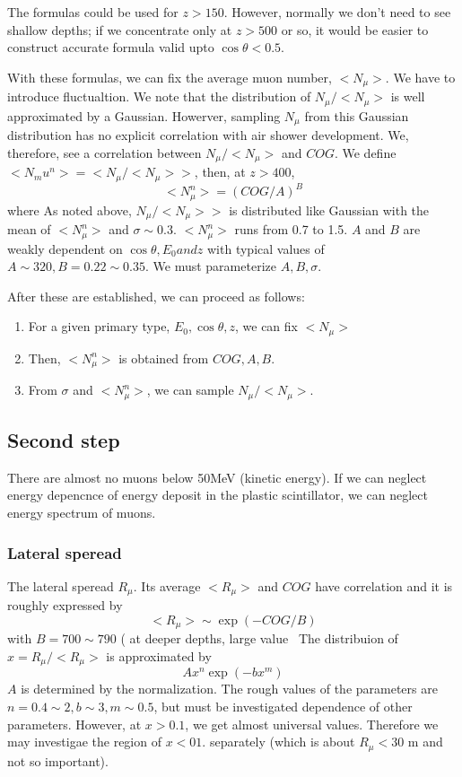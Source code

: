 \documentclass[a4j]{jarticle}
\begin{document}
The formulas could be used for $z>150$. However, normally we don't need
to see shallow depths; if we concentrate only at $z>500$ or so, 
it would be easier to construct accurate formula  valid upto $\cos\theta < 0.5$.


With these formulas, we can fix the average muon number, $<N_\mu>$.
We have to introduce fluctualtion. We note that the distribution of
$N_\mu/<N_\mu>$ is well approximated by a
Gaussian.  Howerver, sampling $N_\mu$ from  this Gaussian distribution
has no explicit correlation with air shower development.  We, therefore,
see a correlation between $N_\mu/<N_\mu>$ and $COG$. 
We define  $<N_mu^n> = < N_\mu/<N_\mu> >$, then, 
 at $z>400$,
\begin{equation}
          <N_\mu^n> = (COG/ A)^B
\end{equation}
where  
As noted above, $N_\mu/<N_\mu> >$
is distributed like Gaussian with the mean of $<N_\mu^n>$ and
$\sigma\sim 0.3$.
  $<N_\mu^n> $ runs from 0.7 to 1.5.
$A$ and $B$ are weakly dependent on $\cos\theta, E_0 and z$ 
with typical values of $ A\sim 320, B=0.22\sim  0.35 $. 
We must parameterize $A, B, \sigma$. 

After these are established, we can proceed as follows:
\begin{enumerate}
\item For a given primary type, $E_0, \cos\theta, z$, we can fix $<N_\mu>$
\item Then,  $<N_\mu^n>$ is obtained from $COG, A, B$.
\item From $\sigma$ and $<N_\mu^n>$, we can sample $N_\mu/<N_\mu>$.
\end{enumerate}


\subsection{Second step}
There are almost no muons below 50MeV (kinetic energy). If we can neglect
energy depencnce of energy deposit in the plastic scintillator,
we can neglect energy spectrum of muons. 


\subsubsection{Lateral speread}
The lateral speread $R_\mu$.  Its average $<R_\mu>$ and $COG$
have correlation and it is roughly expressed by
\begin{equation}
  <R_\mu> \sim  \exp(-COG/B)
\end{equation}
with $B= 700\sim 790$ ( at deeper depths,  large value~
The distribuion of $x=R_\mu/<R_\mu>$ is approximated by
\begin{equation}
 A x^n \exp(-bx^m)
\end{equation}
$A$ is determined by the normalization. The rough values of the parameters
are $n = 0.4\sim 2,    b\sim 3,   m\sim 0.5$, but must be
investigated dependence of other parameters.
However, at $x > 0.1$, we get almost universal values. Therefore
we may investigae the region of $x<01.$ separately (which is
about  $R_\mu<30$ m and not so important).
\end{document}
